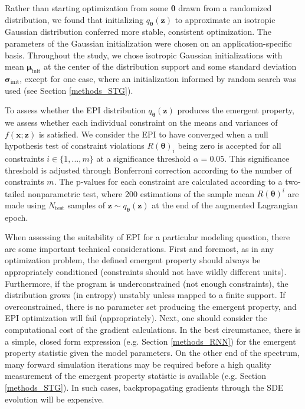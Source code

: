 \documentclass[11pt]{article}
\begin{document}
Rather than starting optimization from some $\bm{\theta}$ drawn from a randomized distribution, we found that initializing $q_{\bm{\theta}}(\mathbf{z})$ to approximate an isotropic Gaussian distribution conferred more stable, consistent optimization.  
The parameters of the Gaussian initialization were chosen on an application-specific basis.  
Throughout the study, we chose isotropic Gaussian initializations with mean $\bm{\mu}_{\text{init}}$ at the center of the distribution support and some standard deviation $\bm{\sigma}_{\text{init}}$, except for one case, where an initialization informed by random search was used (see Section \ref{methods_STG}).

To assess whether the EPI distribution $q_{\bm{\theta}}(\mathbf{z})$ produces the emergent property, we assess whether each individual constraint on the means and variances of $f(\mathbf{x}; \mathbf{z})$ is satisfied.
We consider the EPI to have converged when a null hypothesis test of constraint violations $R(\bm{\theta})_i$ being zero is accepted for all constraints $i \in \{1, ..., m\}$ at a significance threshold $\alpha=0.05$. 
This significance threshold is adjusted through Bonferroni correction according to the number of constraints $m$.  
The p-values for each constraint are calculated according to a two-tailed nonparametric test, where 200 estimations of the sample mean $R(\bm{\theta})^i$ are made using $N_{\text{test}}$ samples of $\mathbf{z} \sim q_{\bm{\theta}}(\mathbf{z})$ at the end of the augmented Lagrangian epoch.

When assessing the suitability of EPI for a particular modeling question, there are some important technical considerations. 
First and foremost, as in any optimization problem, the defined emergent property should always be appropriately conditioned (constraints should not have wildly different units).  
Furthermore, if the program is underconstrained (not enough constraints), the distribution grows (in entropy) unstably unless mapped to a finite support.  
If overconstrained, there is no parameter set producing the emergent property, and EPI optimization will fail (appropriately).
Next, one should consider the computational cost of the gradient calculations. 
In the best circumstance, there is a simple, closed form expression (e.g. Section \ref{methods_RNN}) for the emergent property statistic given the model parameters.  
On the other end of the spectrum, many forward simulation iterations may be required before a high quality measurement of the emergent property statistic is available  (e.g. Section \ref{methods_STG}).  
In such cases, backpropagating gradients through the SDE evolution will be expensive.
\end{document}
